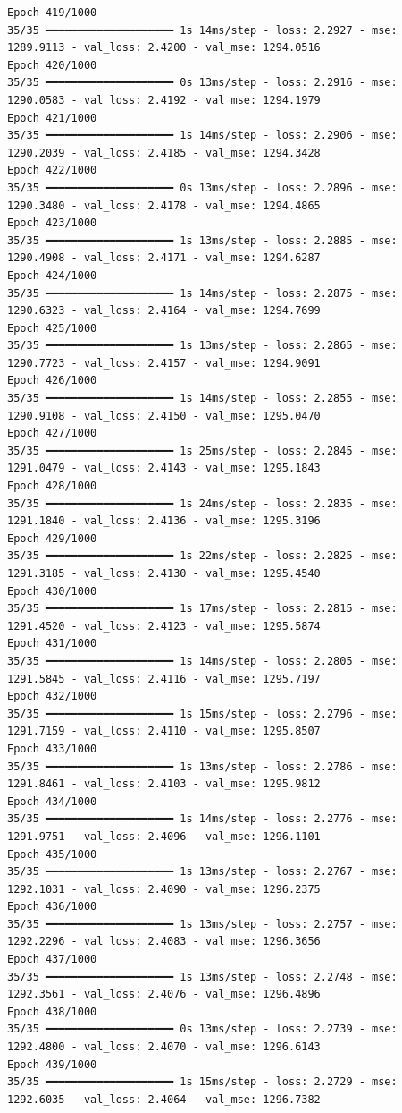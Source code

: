 \documentclass[
  letterpaper,
  DIV=11,
  numbers=noendperiod]{scrreprt}
\begin{document}
\begin{verbatim}
Epoch 419/1000
35/35 ━━━━━━━━━━━━━━━━━━━━ 1s 14ms/step - loss: 2.2927 - mse: 1289.9113 - val_loss: 2.4200 - val_mse: 1294.0516
Epoch 420/1000
35/35 ━━━━━━━━━━━━━━━━━━━━ 0s 13ms/step - loss: 2.2916 - mse: 1290.0583 - val_loss: 2.4192 - val_mse: 1294.1979
Epoch 421/1000
35/35 ━━━━━━━━━━━━━━━━━━━━ 1s 14ms/step - loss: 2.2906 - mse: 1290.2039 - val_loss: 2.4185 - val_mse: 1294.3428
Epoch 422/1000
35/35 ━━━━━━━━━━━━━━━━━━━━ 0s 13ms/step - loss: 2.2896 - mse: 1290.3480 - val_loss: 2.4178 - val_mse: 1294.4865
Epoch 423/1000
35/35 ━━━━━━━━━━━━━━━━━━━━ 1s 13ms/step - loss: 2.2885 - mse: 1290.4908 - val_loss: 2.4171 - val_mse: 1294.6287
Epoch 424/1000
35/35 ━━━━━━━━━━━━━━━━━━━━ 1s 14ms/step - loss: 2.2875 - mse: 1290.6323 - val_loss: 2.4164 - val_mse: 1294.7699
Epoch 425/1000
35/35 ━━━━━━━━━━━━━━━━━━━━ 1s 13ms/step - loss: 2.2865 - mse: 1290.7723 - val_loss: 2.4157 - val_mse: 1294.9091
Epoch 426/1000
35/35 ━━━━━━━━━━━━━━━━━━━━ 1s 14ms/step - loss: 2.2855 - mse: 1290.9108 - val_loss: 2.4150 - val_mse: 1295.0470
Epoch 427/1000
35/35 ━━━━━━━━━━━━━━━━━━━━ 1s 25ms/step - loss: 2.2845 - mse: 1291.0479 - val_loss: 2.4143 - val_mse: 1295.1843
Epoch 428/1000
35/35 ━━━━━━━━━━━━━━━━━━━━ 1s 24ms/step - loss: 2.2835 - mse: 1291.1840 - val_loss: 2.4136 - val_mse: 1295.3196
Epoch 429/1000
35/35 ━━━━━━━━━━━━━━━━━━━━ 1s 22ms/step - loss: 2.2825 - mse: 1291.3185 - val_loss: 2.4130 - val_mse: 1295.4540
Epoch 430/1000
35/35 ━━━━━━━━━━━━━━━━━━━━ 1s 17ms/step - loss: 2.2815 - mse: 1291.4520 - val_loss: 2.4123 - val_mse: 1295.5874
Epoch 431/1000
35/35 ━━━━━━━━━━━━━━━━━━━━ 1s 14ms/step - loss: 2.2805 - mse: 1291.5845 - val_loss: 2.4116 - val_mse: 1295.7197
Epoch 432/1000
35/35 ━━━━━━━━━━━━━━━━━━━━ 1s 15ms/step - loss: 2.2796 - mse: 1291.7159 - val_loss: 2.4110 - val_mse: 1295.8507
Epoch 433/1000
35/35 ━━━━━━━━━━━━━━━━━━━━ 1s 13ms/step - loss: 2.2786 - mse: 1291.8461 - val_loss: 2.4103 - val_mse: 1295.9812
Epoch 434/1000
35/35 ━━━━━━━━━━━━━━━━━━━━ 1s 14ms/step - loss: 2.2776 - mse: 1291.9751 - val_loss: 2.4096 - val_mse: 1296.1101
Epoch 435/1000
35/35 ━━━━━━━━━━━━━━━━━━━━ 1s 13ms/step - loss: 2.2767 - mse: 1292.1031 - val_loss: 2.4090 - val_mse: 1296.2375
Epoch 436/1000
35/35 ━━━━━━━━━━━━━━━━━━━━ 1s 13ms/step - loss: 2.2757 - mse: 1292.2296 - val_loss: 2.4083 - val_mse: 1296.3656
Epoch 437/1000
35/35 ━━━━━━━━━━━━━━━━━━━━ 1s 13ms/step - loss: 2.2748 - mse: 1292.3561 - val_loss: 2.4076 - val_mse: 1296.4896
Epoch 438/1000
35/35 ━━━━━━━━━━━━━━━━━━━━ 0s 13ms/step - loss: 2.2739 - mse: 1292.4800 - val_loss: 2.4070 - val_mse: 1296.6143
Epoch 439/1000
35/35 ━━━━━━━━━━━━━━━━━━━━ 1s 15ms/step - loss: 2.2729 - mse: 1292.6035 - val_loss: 2.4064 - val_mse: 1296.7382

\end{verbatim}
\end{document}
